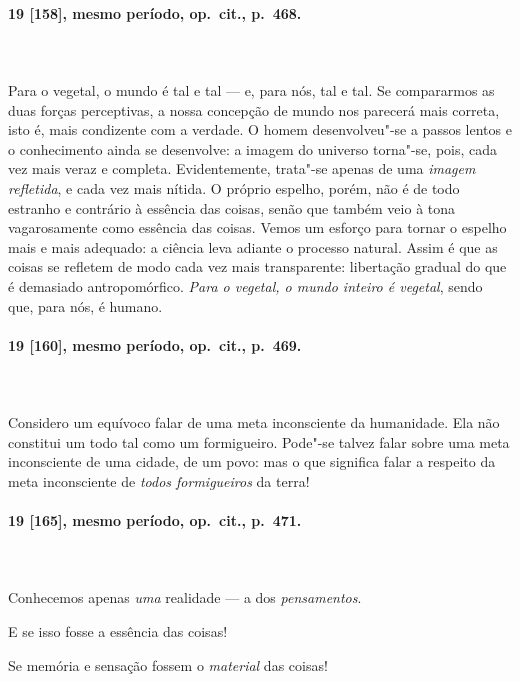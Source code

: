 \pagebreak
\paragraph*{19 [158], mesmo período, op.~cit., p.~468.}
\ \\
\ \\

Para o vegetal, o mundo é tal e tal --- e, para nós, tal e tal. Se
compararmos as duas forças perceptivas, a nossa concepção de mundo nos
parecerá mais correta, isto é, mais condizente com a verdade. O homem
desenvolveu"-se a passos lentos e o conhecimento ainda se desenvolve:
a imagem do universo torna"-se, pois, cada vez mais veraz e completa.
Evidentemente, trata"-se apenas de uma \textit{imagem refletida}, e
cada vez mais nítida. O próprio espelho, porém, não é de todo estranho
e contrário à essência das coisas, senão que também veio à tona
vagarosamente como essência das coisas. Vemos um esforço para tornar o
espelho mais e mais adequado: a ciência leva adiante o processo
natural. Assim é que as coisas se refletem de modo cada vez mais
transparente: libertação gradual do que é demasiado antropomórfico.
\textit{Para o vegetal, o mundo inteiro é vegetal}, sendo que, para
nós, é humano.

\pagebreak
\paragraph*{19 [160], mesmo período, op.~cit., p.~469.}
\ \\
\ \\

Considero um equívoco falar de uma meta inconsciente da humanidade. Ela
não constitui um todo tal como um formigueiro. Pode"-se talvez falar
sobre uma meta inconsciente de uma cidade, de um povo: mas o que
significa falar a respeito da meta inconsciente de \textit{todos
formigueiros} da terra!  

\pagebreak
\paragraph*{19 [165], mesmo período, op.~cit., p.~471.}
\ \\
\ \\

Conhecemos apenas \textit{uma} realidade --- a dos \textit{pensamentos}.

E se isso fosse a essência das coisas!

Se memória e sensação fossem o \textit{material} das coisas!

